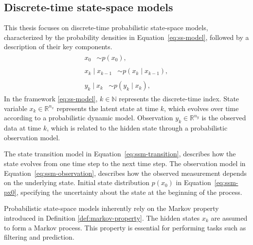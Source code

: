 \documentclass[dissertation,math,vertlayout,pdfa,colorlinks,nologo]{aaltoseries}
\begin{document}
\subsection{Discrete-time state-space models}
This thesis focuses on discrete-time probabilistic state-space models, characterized by the probability densities in Equation~\eqref{eq:ss-model}, followed by a description of their key components.
\begin{subequations}\label{eq:ss-model}
\begin{align}
    \begin{split} \label{eq:ssm-px0}
        x_0 &\sim p(x_0), 
    \end{split}\\
    \begin{split} \label{eq:ssm-transition}
        x_k \mid x_{k-1} &\sim p(x_k \mid x_{k-1}),
    \end{split}\\
    \begin{split} \label{eq:ssm-observation}
        y_k \mid x_k &\sim p(y_k \mid x_k),
    \end{split}
\end{align}
\end{subequations}
In the framework \eqref{eq:ss-model}, $k \in \mathbb{N}$ represents the discrete-time index. State variable $x_k \in \mathbb{R}^{n_x}$ represents the latent state at time $k$, which evolves over time according to a probabilistic dynamic model. Observation $y_k \in \mathbb{R}^{n_y}$ is the observed data at time $k$, which is related to the hidden state through a probabilistic observation model. 

The state transition model in Equation~\eqref{eq:ssm-transition}, describes how the state evolves from one time step to the next time step. The observation model in Equation~\eqref{eq:ssm-observation}, describes how the observed measurement depends on the underlying state. Initial state distribution $p(x_0)$ in Equation~\eqref{eq:ssm-px0}, specifying the uncertainty about the state at the beginning of the process. 

Probabilistic state-space models inherently rely on the Markov property introduced in Definition \ref{def:markov-property}. The hidden states $x_k$ are assumed to form a Markov process. This property is essential for performing tasks such as filtering and prediction.
\end{document}

